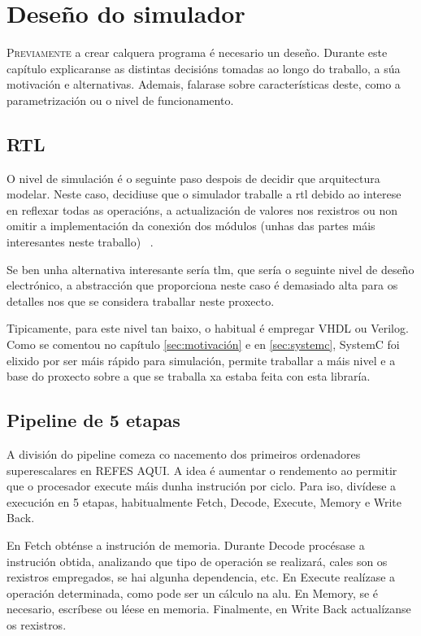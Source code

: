 \chapter{Deseño do simulador}
\label{chap:deseño_simulador}

\lettrine{P}{reviamente} a crear calquera programa é necesario un deseño. Durante este capítulo explicaranse as distintas decisións tomadas ao longo do traballo, a súa motivación e alternativas. Ademais, falarase sobre características deste, como a parametrización ou o nivel de funcionamento.

\section{RTL}\label{sec:rtl}
O nivel de simulación é o seguinte paso despois de decidir que arquitectura modelar. Neste caso, decidiuse que o simulador traballe a \acrfull{rtl} debido ao interese en reflexar todas as operacións, a actualización de valores nos rexistros ou non omitir a implementación da conexión dos módulos (unhas das partes máis interesantes neste traballo) ~\cite{rtl_wikipedia}.

Se ben unha alternativa interesante sería \acrfull{tlm}, que sería o seguinte nivel de deseño electrónico, a abstracción que proporciona neste caso é demasiado alta para os detalles nos que se considera traballar neste proxecto.  

Tipicamente, para este nivel tan baixo, o habitual é empregar VHDL ou Verilog. Como se comentou no capítulo \ref{sec:motivación} e en \ref{sec:systemc}, SystemC foi elixido por ser máis rápido para simulación, permite traballar a máis nivel e a base do proxecto sobre a que se traballa xa estaba feita con esta libraría.

\section{Pipeline de 5 etapas}\label{sec:pipeline_5etapas}
A división do pipeline comeza co nacemento dos primeiros ordenadores superescalares en REFES AQUI. A idea é aumentar o rendemento ao permitir que o procesador execute máis dunha instrución por ciclo. Para iso, divídese a execución en 5 etapas, habitualmente Fetch, Decode, Execute, Memory e Write Back.

En Fetch obténse a instrución de memoria. Durante Decode procésase a instrución obtida, analizando que tipo de operación se realizará, cales son os rexistros empregados, se hai algunha dependencia, etc. En Execute realízase a operación determinada, como pode ser un cálculo na \acrfull{alu}. En Memory, se é necesario, escríbese ou léese en memoria. Finalmente, en Write Back actualízanse os rexistros.

